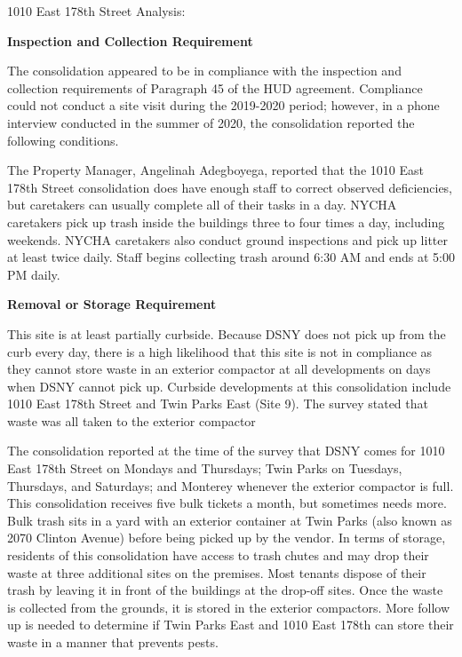 1010 East 178th Street Analysis: 

\textbf{Inspection and Collection Requirement} 

 

The consolidation appeared to be in compliance with the inspection and collection requirements of Paragraph 45 of the HUD agreement. Compliance could not conduct a site visit during the 2019-2020 period; however, in a phone interview conducted in the summer of 2020, the consolidation reported the following conditions.

The Property Manager, Angelinah Adegboyega, reported that the 1010 East 178th Street consolidation does have enough staff to correct observed deficiencies, but caretakers can usually complete all of their tasks in a day. NYCHA caretakers pick up trash inside the buildings three to four times a day, including weekends. NYCHA caretakers also conduct ground inspections and pick up litter at least twice daily. Staff begins collecting trash around 6:30 AM and ends at 5:00 PM daily. 

 

\textbf{Removal or Storage Requirement} 

 

This site is at least partially curbside. Because DSNY does not pick up from the curb every day, there is a high likelihood that this site is not in compliance as they cannot store waste in an exterior compactor at all developments on days when DSNY cannot pick up.  Curbside developments at this consolidation include 1010 East 178th Street and Twin Parks East (Site 9). The survey stated that waste was all taken to the exterior compactor 

 

The consolidation reported at the time of the survey that DSNY comes for 1010 East 178th Street on Mondays and Thursdays; Twin Parks on Tuesdays, Thursdays, and Saturdays; and Monterey whenever the exterior compactor is full. This consolidation receives five bulk tickets a month, but sometimes needs more. Bulk trash sits in a yard with an exterior container at Twin Parks (also known as 2070 Clinton Avenue) before being picked up by the vendor.  In terms of storage, residents of this consolidation have access to trash chutes and may drop their waste at three additional sites on the premises. Most tenants dispose of their trash by leaving it in front of the buildings at the drop-off sites. Once the waste is collected from the grounds, it is stored in the exterior compactors. More follow up is needed to determine if Twin Parks East and 1010 East 178th can store their waste in a manner that prevents pests.  

